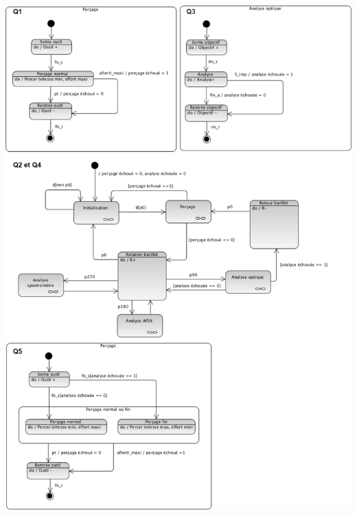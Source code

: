 \documentclass[10pt,fleqn]{article} %
\begin{document}
\begin{center}
\includegraphics[width=\linewidth]{images/fig_09.png}
\end{center}
\end{document}
